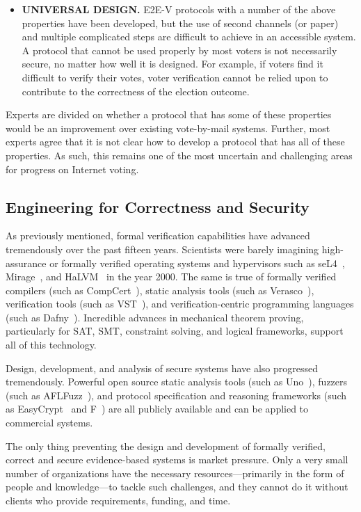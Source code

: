 \begin{itemize}
\item \textbf{UNIVERSAL DESIGN.} E2E-V protocols with a number of the
  above properties have been developed, but the use of second channels
  (or paper) and multiple complicated steps are difficult to achieve
  in an accessible system. A protocol that cannot be used properly by
  most voters is not necessarily secure, no matter how well it is
  designed. For example, if voters find it difficult to verify their
  votes, voter verification cannot be relied upon to contribute to the
  correctness of the election outcome.
\end{itemize}

Experts are divided on whether a protocol that has some of these
properties would be an improvement over existing vote-by-mail
systems. Further, most experts agree that it is not clear how to
develop a protocol that has all of these properties.  As such, this
remains one of the most uncertain and challenging areas for progress
on Internet voting.

\subsection{Engineering for Correctness and Security}

As previously mentioned, formal verification capabilities have
advanced tremendously over the past fifteen years. Scientists were
barely imagining high-assurance or formally verified operating systems
and hypervisors such as seL4~\cite{klein2009sel4},
Mirage~\cite{OpenMirage}, and HaLVM~\cite{HaLVM} in the year 2000. The
same is true of formally verified compilers (such as
CompCert~\cite{CompCert}), static analysis tools (such as
Verasco~\cite{Verasco}), verification tools (such as VST~\cite{VST}),
and verification-centric programming languages (such as
Dafny~\cite{Dafny}). Incredible advances in mechanical theorem
proving, particularly for SAT, SMT, constraint solving, and logical
frameworks, support all of this technology.

Design, development, and analysis of secure systems have also
progressed tremendously. Powerful open source static analysis tools
(such as Uno~\cite{holzmann2002static}), fuzzers (such as
AFLFuzz~\cite{AFLFuzz}), and protocol specification and reasoning
frameworks (such as EasyCrypt~\cite{EasyCrypt} and F\*~\cite{Fstar})
are all publicly available and can be applied to commercial systems.

The only thing preventing the design and development of formally
verified, correct and secure evidence-based systems is market
pressure. Only a very small number of organizations have the necessary
resources---primarily in the form of people and knowledge---to tackle
such challenges, and they cannot do it without clients who provide
requirements, funding, and time.


